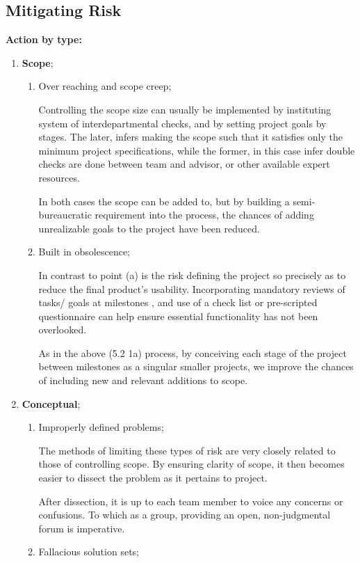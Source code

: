  \subsection{Mitigating Risk}
  \hspace{.35cm} \textbf{Action by type:}
  \begin{enumerate}
  \item \textbf{Scope}; 
  \begin{enumerate}
  \item Over reaching and scope creep; 
  
  Controlling the scope size can usually be implemented by instituting system of interdepartmental checks, and by setting project goals by stages. The later, infers making the scope such that it satisfies only the minimum project specifications, while the former, in this case infer double checks are done between team and advisor, or other available expert resources.
  
  In both cases the scope can be added to, but by building a semi-bureaucratic requirement into the process, the chances of adding unrealizable goals to the project have been reduced.
  \item Built in obsolescence;
  
  In contrast to point (a) is the risk defining the project so precisely as to reduce the final product's usability. Incorporating  mandatory reviews of tasks/ goals at milestones , and use of a check list or pre-scripted questionnaire can help ensure essential functionality has not been overlooked. 
  
  As in the above (5.2 1a) process, by conceiving each stage of the  project between milestones as a singular smaller projects, we improve the chances of including new and relevant additions to scope. 
   \end{enumerate}
  \item \textbf{Conceptual};
  \begin{enumerate}
  \item Improperly defined problems; 
  
  The methods of limiting these types of risk are very closely related to those of controlling scope. By ensuring clarity of scope, it then becomes easier to dissect the problem as it pertains to project.
  
  After dissection, it is up to each team member to voice any concerns or confusions. To which as a group, providing an open, non-judgmental forum is imperative.
  \item Fallacious solution sets; 
  

\end{enumerate}
\end{enumerate}
